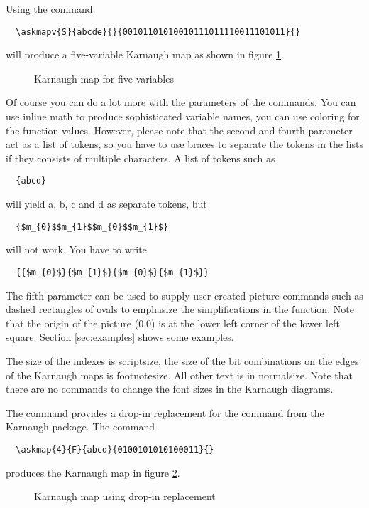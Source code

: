 \documentclass[a4paper,10pt]{ltxdoc}
\begin{document}
Using the command
\begin{verbatim}
  \askmapv{S}{abcde}{}{00101101010010111011110011101011}{}
\end{verbatim}
will produce a five-variable Karnaugh map as shown in figure \ref{fig:askmapv}.

\begin{figure}[H]
\centering
\askmapunitlength=0.88cm
\caption{Karnaugh map for five variables}
\label{fig:askmapv}
\end{figure}

Of course you can do a lot more with the parameters of the commands. You
can use inline math to produce sophisticated variable names, you can
use coloring for the function values. However, please note that the second
and fourth parameter act as a list of tokens, so you have to use braces to
separate the tokens in the lists if they consists of multiple characters.
A list of tokens such as
\begin{verbatim}
  {abcd}
\end{verbatim}
will yield a, b, c and d as separate tokens, but
\begin{verbatim}
  {$m_{0}$$m_{1}$$m_{0}$$m_{1}$}
\end{verbatim}
will not work. You have to write
\begin{verbatim}
  {{$m_{0}$}{$m_{1}$}{$m_{0}$}{$m_{1}$}}
\end{verbatim}

The fifth parameter can be used to supply user created picture commands
such as dashed rectangles of ovals to emphasize the simplifications
in the function. Note that the origin
of the picture (0,0) is at the lower left corner of the lower left square.
Section \ref{sec:examples} shows some examples.
\bigskip

The size of the indexes is scriptsize, the size of the bit combinations
on the edges of the Karnaugh maps is footnotesize. All other text is
in normalsize. Note that there are no commands to change the font sizes
in the Karnaugh diagrams.


The command  provides a drop-in replacement for the command
 from the Karnaugh package. The command
\begin{verbatim}
  \askmap{4}{F}{abcd}{0100101010100011}{}
\end{verbatim}
produces the Karnaugh map in figure \ref{fig:askmap}.
\begin{figure}[H]
\centering
\askmapunitlength=0.88cm
\caption{Karnaugh map using drop-in replacement}
\label{fig:askmap}
\end{figure}
\end{document}
